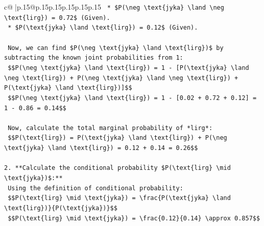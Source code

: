 \documentclass{article}
\begin{document}
{\begin{supertabular}{c@{$\;$}|p{.15\linewidth}@{}p{.15\linewidth}p{.15\linewidth}p{.15\linewidth}p{.15\linewidth}p{.15\linewidth}}
{{{\texttt{    *   \$P(\textbackslash{}neg \textbackslash{}text\{jyka\} \textbackslash{}land \textbackslash{}neg \textbackslash{}text\{lirg\}) = 0.72\$ (Given).} \\
\texttt{    *   \$P(\textbackslash{}text\{jyka\} \textbackslash{}land \textbackslash{}text\{lirg\}) = 0.12\$ (Given).} \\
\\ 
\texttt{    Now, we can find \$P(\textbackslash{}neg \textbackslash{}text\{jyka\} \textbackslash{}land \textbackslash{}text\{lirg\})\$ by subtracting the known joint probabilities from 1:} \\
\texttt{    \$\$P(\textbackslash{}neg \textbackslash{}text\{jyka\} \textbackslash{}land \textbackslash{}text\{lirg\}) = 1 {-} {[}P(\textbackslash{}text\{jyka\} \textbackslash{}land \textbackslash{}neg \textbackslash{}text\{lirg\}) + P(\textbackslash{}neg \textbackslash{}text\{jyka\} \textbackslash{}land \textbackslash{}neg \textbackslash{}text\{lirg\}) + P(\textbackslash{}text\{jyka\} \textbackslash{}land \textbackslash{}text\{lirg\}){]}\$\$} \\
\texttt{    \$\$P(\textbackslash{}neg \textbackslash{}text\{jyka\} \textbackslash{}land \textbackslash{}text\{lirg\}) = 1 {-} {[}0.02 + 0.72 + 0.12{]} = 1 {-} 0.86 = 0.14\$\$} \\
\\ 
\texttt{    Now, calculate the total marginal probability of *lirg*:} \\
\texttt{    \$\$P(\textbackslash{}text\{lirg\}) = P(\textbackslash{}text\{jyka\} \textbackslash{}land \textbackslash{}text\{lirg\}) + P(\textbackslash{}neg \textbackslash{}text\{jyka\} \textbackslash{}land \textbackslash{}text\{lirg\}) = 0.12 + 0.14 = 0.26\$\$} \\
\\ 
\texttt{2.  **Calculate the conditional probability \$P(\textbackslash{}text\{lirg\} \textbackslash{}mid \textbackslash{}text\{jyka\})\$:**} \\
\texttt{    Using the definition of conditional probability:} \\
\texttt{    \$\$P(\textbackslash{}text\{lirg\} \textbackslash{}mid \textbackslash{}text\{jyka\}) = \textbackslash{}frac\{P(\textbackslash{}text\{jyka\} \textbackslash{}land \textbackslash{}text\{lirg\})\}\{P(\textbackslash{}text\{jyka\})\}\$\$} \\
\texttt{    \$\$P(\textbackslash{}text\{lirg\} \textbackslash{}mid \textbackslash{}text\{jyka\}) = \textbackslash{}frac\{0.12\}\{0.14\} \textbackslash{}approx 0.857\$\$} \\
}}}
\end{supertabular}}
\end{document}
